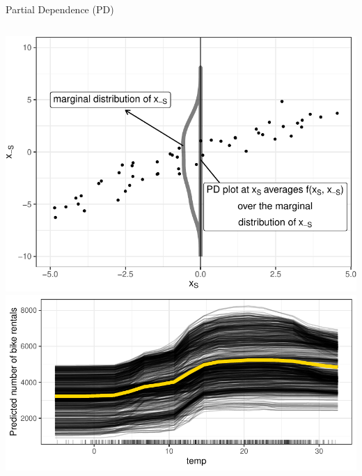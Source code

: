 \documentclass[10pt,compress,t,notes=noshow, xcolor=table]{beamer}
\begin{document}
\begin{frame}{Partial Dependence (PD) }
\begin{columns}[T, totalwidth=\textwidth]
\begin{column}{0.43\textwidth}
\centering
\includegraphics[width=\textwidth]{figure/pdplot.pdf}\\
\medskip
\includegraphics[width=\textwidth]{figure/pdp_bike.pdf}
\end{column}
\end{columns}

\end{frame}
\end{document}
